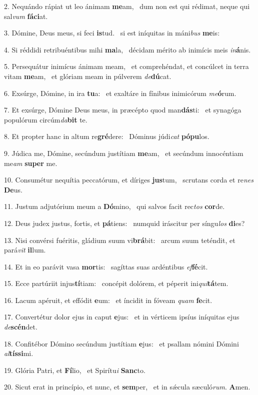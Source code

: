 2. Nequándo rápiat ut leo ánimam \textbf{me}am, \ast\  dum non est qui rédimat, neque qui sal\textit{vum} \textbf{fá}\textbf{ci}at.\

3. Dómine, Deus meus, si feci \textbf{is}tud. \ast\  si est iníquitas in máni\textit{bus} \textbf{me}is:\

4. Si réddidi retribuéntibus mihi \textbf{ma}la, \ast\  décidam mérito ab inimícis meis \textit{in}\textbf{á}nis.\

5. Persequátur inimícus ánimam meam, \dag\  et comprehéndat, et concúlcet in terra vitam \textbf{me}am, \ast\  et glóriam meam in púlverem \textit{de}\textbf{dú}cat.\

6. Exsúrge, Dómine, in ira \textbf{tu}a: \ast\  et exaltáre in fínibus inimicórum \textit{me}\textbf{ó}rum.\

7. Et exsúrge, Dómine Deus meus, in præcépto quod man\textbf{dás}ti: \ast\  et synagóga populórum circúm\textit{da}\textbf{bit} te.\

8. Et propter hanc in altum re\textbf{gré}dere: \ast\  Dóminus júdi\textit{cat} \textbf{pó}\textbf{pu}los.\

9. Júdica me, Dómine, secúndum justítiam \textbf{me}am, \ast\  et secúndum innocéntiam me\textit{am} \textbf{su}\textbf{per} me.\

10. Consumétur nequítia peccatórum, et díriges \textbf{jus}tum, \ast\  scrutans corda et re\textit{nes} \textbf{De}us.\

11. Justum adjutórium meum a \textbf{Dó}mino, \ast\  qui salvos facit rec\textit{tos} \textbf{cor}de.\

12. Deus judex justus, fortis, et \textbf{pá}tiens: \ast\  numquid iráscitur per síngu\textit{los} \textbf{di}es?\

13. Nisi convérsi fuéritis, gládium suum vi\textbf{brá}bit: \ast\  arcum suum teténdit, et pará\textit{vit} \textbf{il}lum.\

14. Et in eo parávit vasa \textbf{mor}tis: \ast\  sagíttas suas ardéntibus \textit{ef}\textbf{fé}cit.\

15. Ecce partúriit injus\textbf{tí}tiam: \ast\  concépit dolórem, et péperit ini\textit{qui}\textbf{tá}tem.\

16. Lacum apéruit, et effódit \textbf{e}um: \ast\  et íncidit in fóveam \textit{quam} \textbf{fe}cit.\

17. Convertétur dolor ejus in caput \textbf{e}jus: \ast\  et in vérticem ipsíus iníquitas ejus \textit{de}\textbf{scén}det.\

18. Confitébor Dómino secúndum justítiam \textbf{e}jus: \ast\  et psallam nómini Dómini \textit{al}\textbf{tís}\textbf{si}mi.\

19. Glória Patri, et \textbf{Fí}lio, \ast\  et Spirítu\textit{i} \textbf{Sanc}to.\

20. Sicut erat in princípio, et nunc, et \textbf{sem}per, \ast\  et in sǽcula sæculó\textit{rum}. \textbf{A}men.\

